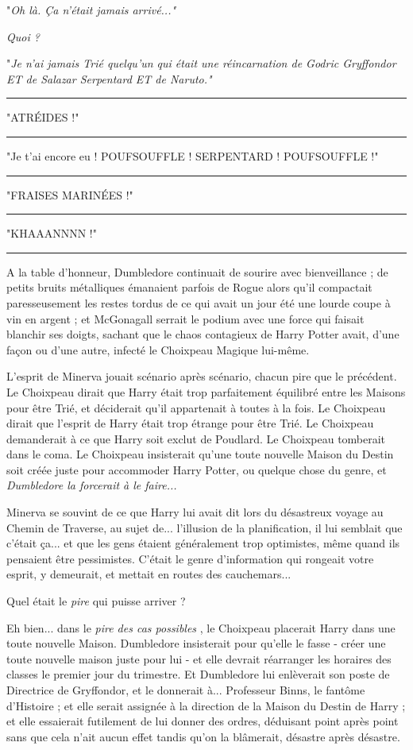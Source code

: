 "\emph{Oh là. Ça n'était jamais arrivé..."} 

\emph{Quoi ?} 

"\emph{Je n'ai jamais Trié quelqu'un qui était une réincarnation de Godric Gryffondor ET de Salazar Serpentard ET de Naruto."} 
\par\noindent\rule{\textwidth}{0.4pt}
"ATRÉIDES !"
\par\noindent\rule{\textwidth}{0.4pt}
"Je t'ai encore eu ! POUFSOUFFLE ! SERPENTARD ! POUFSOUFFLE !"
\par\noindent\rule{\textwidth}{0.4pt}
"FRAISES MARINÉES !"
\par\noindent\rule{\textwidth}{0.4pt}
"KHAAANNNN !"
\par\noindent\rule{\textwidth}{0.4pt}
A la table d'honneur, Dumbledore continuait de sourire avec bienveillance ; de petits bruits métalliques émanaient parfois de Rogue alors qu'il compactait paresseusement les restes tordus de ce qui avait un jour été une lourde coupe à vin en argent ; et McGonagall serrait le podium avec une force qui faisait blanchir ses doigts, sachant que le chaos contagieux de Harry Potter avait, d'une façon ou d'une autre, infecté le Choixpeau Magique lui-même.

L'esprit de Minerva jouait scénario après scénario, chacun pire que le précédent. Le Choixpeau dirait que Harry était trop parfaitement équilibré entre les Maisons pour être Trié, et déciderait qu'il appartenait à toutes à la fois. Le Choixpeau dirait que l'esprit de Harry était trop étrange pour être Trié. Le Choixpeau demanderait à ce que Harry soit exclut de Poudlard. Le Choixpeau tomberait dans le coma. Le Choixpeau insisterait qu'une toute nouvelle Maison du Destin soit créée juste pour accommoder Harry Potter, ou quelque chose du genre, et \emph{Dumbledore la forcerait à le faire...} 

Minerva se souvint de ce que Harry lui avait dit lors du désastreux voyage au Chemin de Traverse, au sujet de... l'illusion de la planification, il lui semblait que c'était ça... et que les gens étaient généralement trop optimistes, même quand ils pensaient être pessimistes. C'était le genre d'information qui rongeait votre esprit, y demeurait, et mettait en routes des cauchemars...

Quel était le \emph{pire}  qui puisse arriver ?

Eh bien... dans le \emph{pire des cas possibles} , le Choixpeau placerait Harry dans une toute nouvelle Maison. Dumbledore insisterait pour qu'elle le fasse - créer une toute nouvelle maison juste pour lui - et elle devrait réarranger les horaires des classes le premier jour du trimestre. Et Dumbledore lui enlèverait son poste de Directrice de Gryffondor, et le donnerait à... Professeur Binns, le fantôme d'Histoire ; et elle serait assignée à la direction de la Maison du Destin de Harry ; et elle essaierait futilement de lui donner des ordres, déduisant point après point sans que cela n'ait aucun effet tandis qu'on la blâmerait, désastre après désastre.

